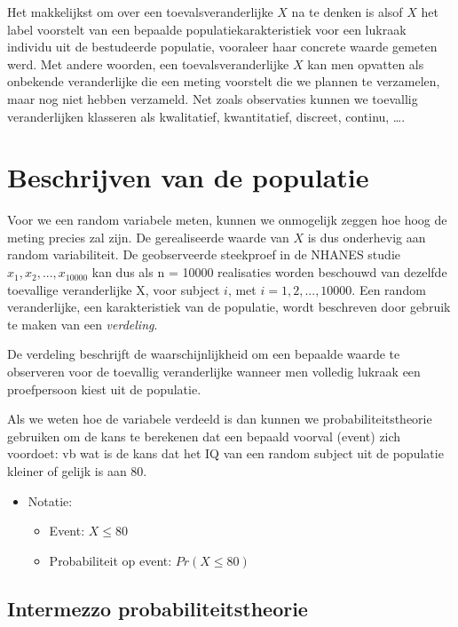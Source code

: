 \documentclass[
  dutch,
  letterpaper,
  12pt]{book}
\providecommand{\tightlist}{%
  \setlength{\itemsep}{0pt}\setlength{\parskip}{0pt}}
\theoremstyle{definition}
\theoremstyle{definition}
\theoremstyle{definition}
\theoremstyle{remark}
\begin{document}
Het makkelijkst om over een toevalsveranderlijke \(X\) na te denken is
alsof \(X\) het label voorstelt van een bepaalde populatiekarakteristiek
voor een lukraak individu uit de bestudeerde populatie, vooraleer haar
concrete waarde gemeten werd. Met andere woorden, een
toevalsveranderlijke \(X\) kan men opvatten als onbekende veranderlijke
die een meting voorstelt die we plannen te verzamelen, maar nog niet
hebben verzameld. Net zoals observaties kunnen we toevallig
veranderlijken klasseren als kwalitatief, kwantitatief, discreet,
continu, \ldots.

\section{Beschrijven van de
populatie}\label{beschrijven-van-de-populatie}

Voor we een random variabele meten, kunnen we onmogelijk zeggen hoe hoog
de meting precies zal zijn. De gerealiseerde waarde van \(X\) is dus
onderhevig aan random variabiliteit. De geobserveerde steekproef in de
NHANES studie \(x_1, x_2, . . . , x_{10000}\) kan dus als n = 10000
realisaties worden beschouwd van dezelfde toevallige veranderlijke X,
voor subject \(i\), met \(i = 1,2,...,10000\). Een random veranderlijke,
een karakteristiek van de populatie, wordt beschreven door gebruik te
maken van een \emph{verdeling}.

De verdeling beschrijft de waarschijnlijkheid om een bepaalde waarde te
observeren voor de toevallig veranderlijke wanneer men volledig lukraak
een proefpersoon kiest uit de populatie.

Als we weten hoe de variabele verdeeld is dan kunnen we
probabiliteitstheorie gebruiken om de kans te berekenen dat een bepaald
voorval (event) zich voordoet: vb wat is de kans dat het IQ van een
random subject uit de populatie kleiner of gelijk is aan 80.

\begin{itemize}
\item
  Notatie:

  \begin{itemize}
  \tightlist
  \item
    Event: \(X \leq 80\)
  \item
    Probabiliteit op event: \(Pr(X \leq 80)\)
  \end{itemize}
\end{itemize}

\subsection{Intermezzo
probabiliteitstheorie}\label{intermezzo-probabiliteitstheorie}
\end{document}
